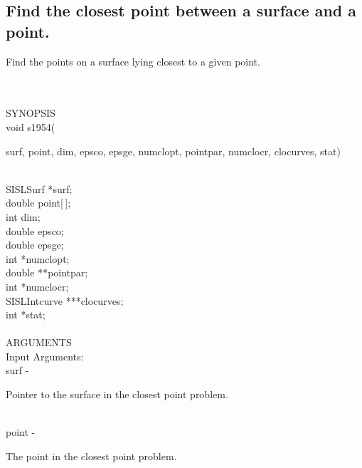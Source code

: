 \subsection{Find the closest point between a surface and a point.}
\begin{minipg1}
  Find the points on a surface lying closest to a given point.
\end{minipg1} \\ \\
SYNOPSIS\\
        \>void s1954(\begin{minipg3}
                        {\fov surf}, {\fov point}, {\fov dim}, {\fov epsco}, {\fov epsge}, {\fov numclopt}, {\fov pointpar},
                        {\fov numclocr}, {\fov clocurves}, {\fov stat})
                \end{minipg3}\\[0.3ex]
                \>\>    SISLSurf        \>      *{\fov surf};\\
                \>\>    double  \>      {\fov point}[\,];\\
                \>\>    int     \>      {\fov dim};\\
                \>\>    double  \>      {\fov epsco};\\
                \>\>    double  \>      {\fov epsge};\\
                \>\>    int     \>      *{\fov numclopt};\\
                \>\>    double  \>      **{\fov pointpar};\\
                \>\>    int     \>      *{\fov numclocr};\\
                \>\>    SISLIntcurve\>  ***{\fov clocurves};\\
                \>\>    int     \>      *{\fov stat};\\
\\
ARGUMENTS\\
        \>Input Arguments:\\
        \>\>    {\fov surf}\> - \>      \begin{minipg2}
                                Pointer to the surface in the closest point
                                problem.
                                \end{minipg2}\\[0.3ex]
        \>\>    {\fov point}\> - \>     \begin{minipg2}
                                The point in the closest point problem.
                                \end{minipg2}\\
